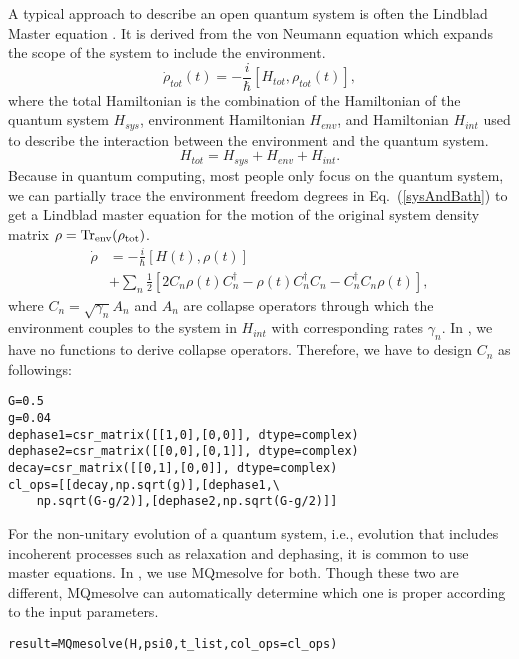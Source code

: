A typical approach to describe an open quantum system is often the Lindblad Master equation \cite{lindblad1976generators}. It is derived from the von Neumann equation which expands the scope of the system to include the environment.
\begin{equation}
    \dot{\rho}_{tot}(t)=-\frac{i}{\hbar}\left[H_{tot},\rho_{tot}(t)\right],
    \label{sysAndBath}
\end{equation}
where the total Hamiltonian is the combination of the Hamiltonian of the quantum system $H_{sys}$, environment Hamiltonian $H_{env}$, and Hamiltonian $H_{int}$ used to describe the interaction between the environment and the quantum system.
\begin{equation}
    H_{tot}=H_{sys}+H_{env}+H_{int}.
\end{equation}
Because in quantum computing, most people only focus on the quantum system, we can partially trace the environment freedom degrees in Eq.~(\ref{sysAndBath}) to get a Lindblad master equation for the motion of the original system density matrix $\rho=\rm{Tr}_{env}(\rho_{tot})$.
\begin{equation}
    \begin{split}
        \dot{\rho}&=-\frac{i}{\hbar}\left[H(t),\rho(t)\right]\\
        &+\sum_{n}\frac{1}{2}\left[2C_{n}\rho(t)C^{\dagger}_{n}-\rho(t)C_{n}^{\dagger}C_{n}-C_{n}^{\dagger}C_{n}\rho(t)\right],
    \end{split}
\end{equation}
where $C_{n}=\sqrt{\gamma_{n}}A_{n}$ and $A_n$ are collapse operators through which the environment couples to the system in $H_{int}$ with corresponding rates $\gamma_{n}$. In \MindQuantum, we have no functions to derive collapse operators. Therefore, we have to design $C_{n}$ as followings:
\begin{lstlisting}
G=0.5
g=0.04
dephase1=csr_matrix([[1,0],[0,0]], dtype=complex)
dephase2=csr_matrix([[0,0],[0,1]], dtype=complex)
decay=csr_matrix([[0,1],[0,0]], dtype=complex)
cl_ops=[[decay,np.sqrt(g)],[dephase1,\
    np.sqrt(G-g/2)],[dephase2,np.sqrt(G-g/2)]]
\end{lstlisting}
For the non-unitary evolution of a quantum system, i.e., evolution that includes incoherent processes such as relaxation and dephasing, it is common to use master equations. In \MindQuantum, we use MQmesolve for both. Though these two are different, MQmesolve can automatically determine which one is proper according to the input parameters.
\begin{lstlisting}
result=MQmesolve(H,psi0,t_list,col_ops=cl_ops)
\end{lstlisting}


